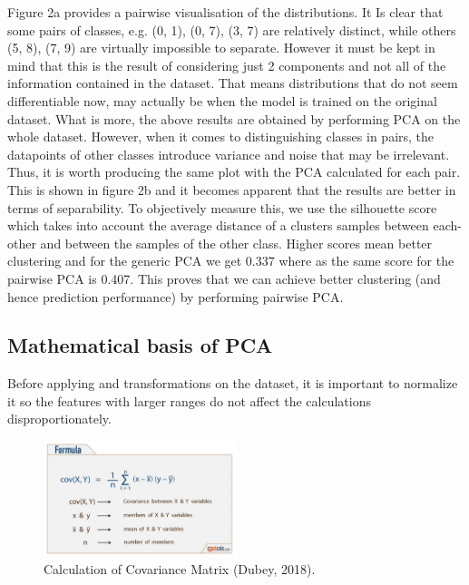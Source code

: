 \documentclass{article}
\begin{document}
Figure 2a provides a pairwise visualisation of the distributions.
It Is clear that some pairs of classes, e.g. (0, 1), (0, 7), (3, 7) are relatively distinct, while others (5, 8), (7, 9) are virtually impossible to separate.
However it must be kept in mind that this is the result of considering just 2 components and not all of the information contained in the dataset.
That means distributions that do not seem differentiable now, may actually be when the model is trained on the original dataset.
What is more, the above results are obtained by performing PCA on the whole dataset.
However, when it comes to distinguishing classes in pairs, the datapoints of other classes introduce variance and noise that may be irrelevant.
Thus, it is worth producing the same plot with the PCA calculated for each pair.
This is shown in figure 2b and it becomes apparent that the results are better in terms of separability.
To objectively measure this, we use the silhouette score which takes into account the average distance of a clusters samples between each-other and between the samples of the other class.
Higher scores mean better clustering and for the generic PCA we get 0.337 where as the same score for the pairwise PCA is 0.407.
This proves that we can achieve better clustering (and hence prediction performance) by performing pairwise PCA.


\subsection{Mathematical basis of PCA}
Before applying and transformations on the dataset, it is important to normalize it so the features with larger ranges do not affect the calculations disproportionately. 

\begin{figure}[h!]
    \centering
    \includegraphics[width=0.5\textwidth]{./plots/plot4.png}  %
    \caption{Calculation of Covariance Matrix (Dubey, 2018).}
    \label{fig:plot5}  %
\end{figure}
\end{document}
